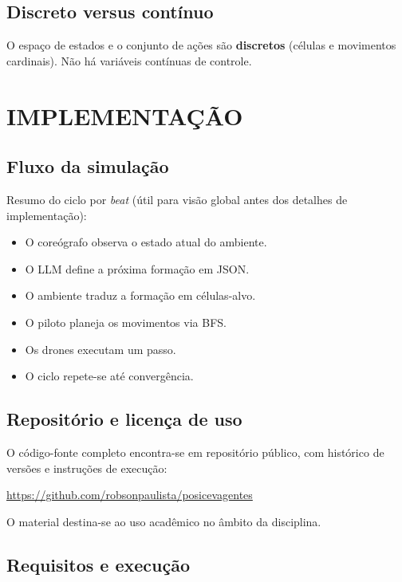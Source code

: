 \documentclass[12pt,a4paper,oneside]{article}
\begin{document}
\subsection{Discreto versus contínuo}

O espaço de estados e o conjunto de ações são \textbf{discretos} (células e movimentos cardinais). Não há variáveis contínuas de controle.

\section{IMPLEMENTAÇÃO}

\subsection{Fluxo da simulação}

Resumo do ciclo por \textit{beat} (útil para visão global antes dos detalhes de implementação):

\begin{itemize}[leftmargin=1.25cm]
  \item O coreógrafo observa o estado atual do ambiente.
  \item O LLM define a próxima formação em JSON.
  \item O ambiente traduz a formação em células-alvo.
  \item O piloto planeja os movimentos via BFS.
  \item Os drones executam um passo.
  \item O ciclo repete-se até convergência.
\end{itemize}

\subsection{Repositório e licença de uso}

O código-fonte completo encontra-se em repositório público, com histórico de versões e instruções de execução:

\begin{center}
\url{https://github.com/robsonpaulista/posicevagentes}
\end{center}

O material destina-se ao uso acadêmico no âmbito da disciplina.

\subsection{Requisitos e execução}
\end{document}
